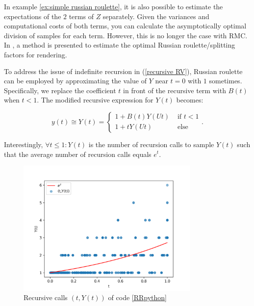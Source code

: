 \documentclass[a4paper,12pt]{article}
\begin{document}
\begin{related}
    In example \ref{ex:simple russian roulette}, it is also
    possible to estimate the expectations of the $2$ terms
    of $Z$ separately. Given the variances and computational costs
    of both terms, you can calculate the asymptotically optimal division
    of samples for each term. However, this is no longer the case with RMC.
    In \cite{rath_ears_2022}, a method is presented to estimate the optimal
    Russian roulette/splitting factors for rendering.
\end{related}


\begin{example} \label{ex: russian roulette}
    To address the issue of indefinite recursion in
    (\ref{recursive RV}), Russian roulette can be employed
    by approximating the value of $Y$ near $t = 0$ with $1$
    sometimes. Specifically, we replace the coefficient $t$
    in front of the recursive term with $B(t)$ when $t < 1$.
    The modified recursive expression for $Y(t)$ becomes:

    \begin{equation}\label{eq:rr example}
        y(t) \cong Y(t) =
        \begin{cases}
            1 + B(t)Y(Ut) & \text{ if } t < 1 \\
            1 + tY(Ut)    & \text{ else}
        \end{cases}.
    \end{equation}
\end{example}

\vspace{0.2cm}

\begin{pythonn} \label{RRpython}
    Interestingly, $\forall t \le 1:Y(t)$ is the number of recursion calls
    to sample $Y(t)$ such that the average number of recursion
    calls equals $e^{t}$.
    \begin{figure}[h!]
        \centering
        \includegraphics[width=0.8\textwidth]{plots/russian roulette example.png}
        \caption{Recursive calls $(t,Y(t))$ of code \ref{RRpython} }
        \label{fig:russian roulette}
    \end{figure}

\end{pythonn}
\end{document}
